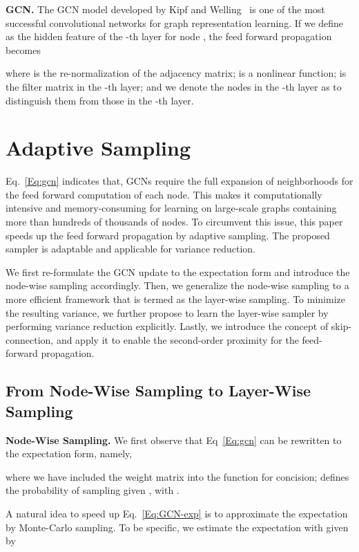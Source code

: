 \documentclass{article}
\begin{document}
\textbf{GCN.}
The GCN model developed by Kipf and Welling~\cite{kipf2016semi} is one of the most successful convolutional networks for graph representation learning.
If we define  as the hidden feature of the -th layer for node , the feed forward propagation becomes
\vskip -0.25in

\vskip -0.1in
where  is the re-normalization of the adjacency matrix;  is a nonlinear function;  is the filter matrix in the -th layer; and we denote the nodes in the -th layer as  to distinguish them from those in the -th layer.




\section{Adaptive Sampling}

Eq.~\eqref{Eq:gcn} indicates that, GCNs require the full expansion of neighborhoods for the feed forward computation of each node. This makes it computationally intensive and memory-consuming for learning on large-scale graphs containing more than hundreds of thousands of nodes. To circumvent this issue, this paper speeds up the feed forward propagation by adaptive sampling. The proposed sampler is adaptable and applicable for variance reduction.

We first re-formulate the GCN update to the expectation form and introduce the node-wise sampling accordingly. Then, we generalize the node-wise sampling to a more efficient framework that is termed as the layer-wise sampling. To minimize the resulting variance, we further propose to learn the layer-wise sampler by performing variance reduction explicitly. Lastly, we introduce the concept of skip-connection, and apply it to enable the second-order proximity for the feed-forward propagation.

\subsection{From Node-Wise Sampling to Layer-Wise Sampling}



\textbf{Node-Wise Sampling.} We first observe that Eq~\eqref{Eq:gcn} can be rewritten to the expectation form, namely,
\vskip -0.2in

\vskip -0.1in
where we have included the weight matrix  into the function  for concision;  defines the probability of sampling  given , with .

A natural idea to speed up Eq.~\eqref{Eq:GCN-exp} is to approximate the expectation by Monte-Carlo sampling. To be specific, we estimate the expectation  with  given by
\vskip -0.2in
\end{document}

